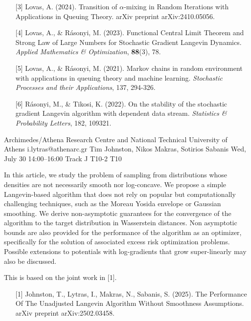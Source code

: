 \begin{talk}
\begin{enumerate}
	\item[{[3]}] Lovas, A. (2024). Transition of $\alpha $-mixing in Random Iterations with Applications in Queuing Theory. arXiv preprint arXiv:2410.05056.
	
	\item[{[4]}] Lovas, A., \& R\'asonyi, M. (2023). Functional Central Limit Theorem and Strong Law of Large Numbers for Stochastic Gradient Langevin Dynamics. {\it Applied Mathematics \& Optimization}, \textbf{88}(3), 78.
	
	\item[{[5]}] Lovas, A., \& R\'asonyi, M. (2021). Markov chains in random environment with applications in queuing theory and machine learning. {\it Stochastic Processes and their Applications}, 137, 294-326.
	
	\item[{[6]}] R\'asonyi, M., \& Tikosi, K. (2022). On the stability of the stochastic gradient Langevin algorithm with dependent data stream. {\it Statistics \& Probability Letters}, 182, 109321.
	
\end{enumerate}

\end{talk}

\begin{talk}
  {Archimedes/Athena Research Centre and National Technical University of Athens}%
  {i.lytras@athenarc.gr}%
  {Tim Johnston, Nikos Makras, Sotirios Sabanis}%
  {}%
  {}%
  {}%
  {Wed, July 30 14:00–16:00 Track J}%
  {T10-2}%
  {T10}%
  
				
			
In this article, we study the problem of sampling from distributions whose densities are not necessarily smooth nor log-concave. We propose a simple Langevin-based algorithm that does not rely on popular but computationally challenging techniques, such as the Moreau Yosida envelope or Gaussian smoothing. We derive non-asymptotic guarantees for the convergence of the algorithm to the target distribution in Wasserstein distances. Non asymptotic bounds are also provided for the performance of the algorithm as an optimizer, specifically for the solution of associated excess risk optimization problems.\\
Possible extensions to potentials with log-gradients that grow super-linearly may also be discussed.

This is based on the joint work in [1].
\medskip

\begin{enumerate}
    \item [{[1]}] Johnston, T., Lytras, I., Makras, N., Sabanis, S. (2025). The Performance Of The Unadjusted Langevin Algorithm Without Smoothness Assumptions. arXiv preprint arXiv:2502.03458.
\end{enumerate}
\end{talk}

